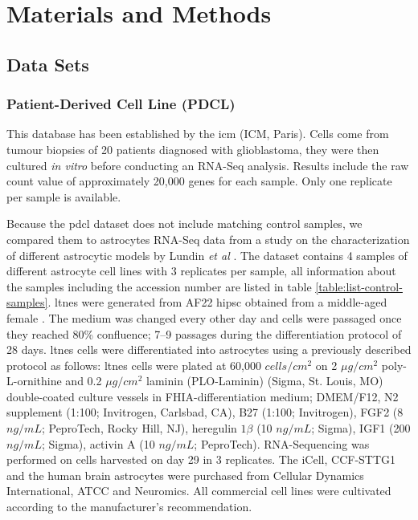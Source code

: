 \section{Materials and Methods}

\subsection{Data Sets}

\subsubsection{Patient-Derived Cell Line (PDCL)}

This database has been established by the \acrlong{icm} (ICM, Paris).
Cells come from tumour biopsies of 20 patients diagnosed with glioblastoma, they were then cultured \textit{in vitro} before conducting an RNA-Seq analysis.
Results include the raw count value of approximately 20,000 genes for each sample.
Only one replicate per sample is available.

Because the \acrshort{pdcl} dataset does not include matching control samples, we compared them to astrocytes RNA-Seq data from a study on the characterization of different astrocytic models by Lundin \textit{et al} \cite*{Lundin2018}.
The dataset contains 4 samples of different astrocyte cell lines with 3 replicates per sample, all information about the samples including the accession number are listed in table \ref*{table:list-control-samples}.
\acrfull{ltnes} were generated from AF22 \acrfull{hipsc} obtained from a middle-aged female \cite*{Falk2012}.
The medium was changed every other day and cells were passaged once they reached 80\% confluence; 7–9 passages during the differentiation protocol of 28 days.
\acrshort{ltnes} cells were differentiated into astrocytes using a previously described protocol \cite*{Lundin2018} as follows: \acrshort{ltnes} cells were plated at 60,000 $cells/cm^2$ on 2 $\mu g/cm^2$ poly-L-ornithine and 0.2 $\mu g/cm^2$ laminin (PLO-Laminin) (Sigma, St. Louis, MO) double-coated culture vessels in FHIA-differentiation medium; DMEM/F12, N2 supplement (1:100; Invitrogen, Carlsbad, CA), B27 (1:100; Invitrogen), FGF2 (8 $ng/mL$; PeproTech, Rocky Hill, NJ), heregulin $1 \beta$ (10 $ng/mL$; Sigma), IGF1 (200 $ng/mL$; Sigma), activin A (10 $ng/mL$; PeproTech).
RNA-Sequencing was performed on cells harvested on day 29 in 3 replicates.
The iCell, CCF-STTG1 and the human brain astrocytes were purchased from Cellular Dynamics International, ATCC and Neuromics.
All commercial cell lines were cultivated according to the manufacturer's recommendation.

